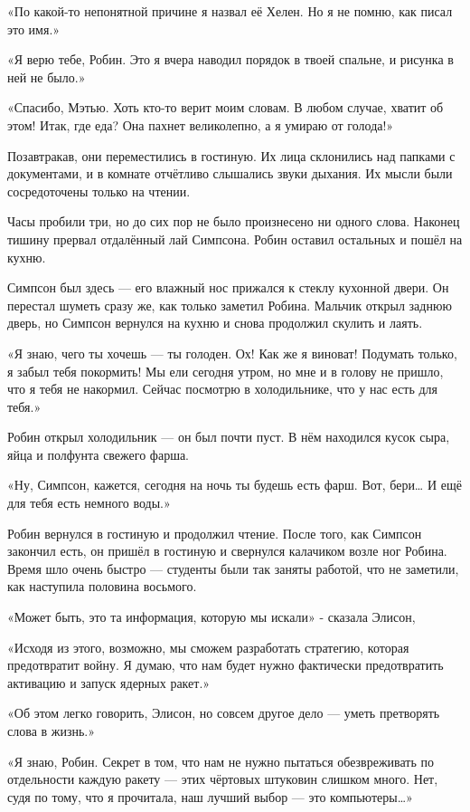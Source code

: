 \documentclass[a4paper,12pt]{book}
\begin{document}
«По какой-то непонятной причине я назвал её Хелен. Но я не помню, как писал это имя.»
\par
«Я верю тебе, Робин. Это я вчера наводил порядок в твоей спальне, и рисунка в ней не было.»
\par
«Спасибо, Мэтью. Хоть кто-то верит моим словам. В любом случае, хватит об этом! Итак, где еда? Она пахнет великолепно, а я умираю от голода!»\\
\par
Позавтракав, они переместились в гостиную. Их лица склонились над папками с документами, и в комнате отчётливо слышались звуки дыхания. Их мысли были сосредоточены только на чтении.
\par
Часы пробили три, но до сих пор не было произнесено ни одного слова. Наконец тишину прервал отдалённый лай Симпсона. Робин оставил остальных и пошёл на кухню.
\par
Симпсон был здесь — его влажный нос прижался к стеклу кухонной двери. Он перестал шуметь сразу же, как только заметил Робина. Мальчик открыл заднюю дверь, но Симпсон вернулся на кухню и снова продолжил скулить и лаять.
\par
«Я знаю, чего ты хочешь — ты голоден. Ох! Как же я виноват! Подумать только, я забыл тебя покормить! Мы ели сегодня утром, но мне и в голову не пришло, что я тебя не накормил. Сейчас посмотрю в холодильнике, что у нас есть для тебя.»
\par
Робин открыл холодильник — он был почти пуст. В нём находился кусок сыра, яйца и полфунта свежего фарша.
\par
«Ну, Симпсон, кажется, сегодня на ночь ты будешь есть фарш. Вот, бери… И ещё для тебя есть немного воды.»
\par
Робин вернулся в гостиную и продолжил чтение. После того, как Симпсон закончил есть, он пришёл в гостиную и свернулся калачиком возле ног Робина. Время шло очень быстро — студенты были так заняты работой, что не заметили, как наступила половина восьмого.
\par
«Может быть, это та информация, которую мы искали» - сказала Элисон,
\par
«Исходя из этого, возможно, мы сможем разработать стратегию, которая предотвратит войну. Я думаю, что нам будет нужно фактически предотвратить активацию и запуск ядерных ракет.»
\par
«Об этом легко говорить, Элисон, но совсем другое дело — уметь претворять слова в жизнь.»
\par
«Я знаю, Робин. Секрет в том, что нам не нужно пытаться обезвреживать по отдельности каждую ракету — этих чёртовых штуковин слишком много. Нет, судя по тому, что я прочитала, наш лучший выбор — это компьютеры…»
\end{document}

